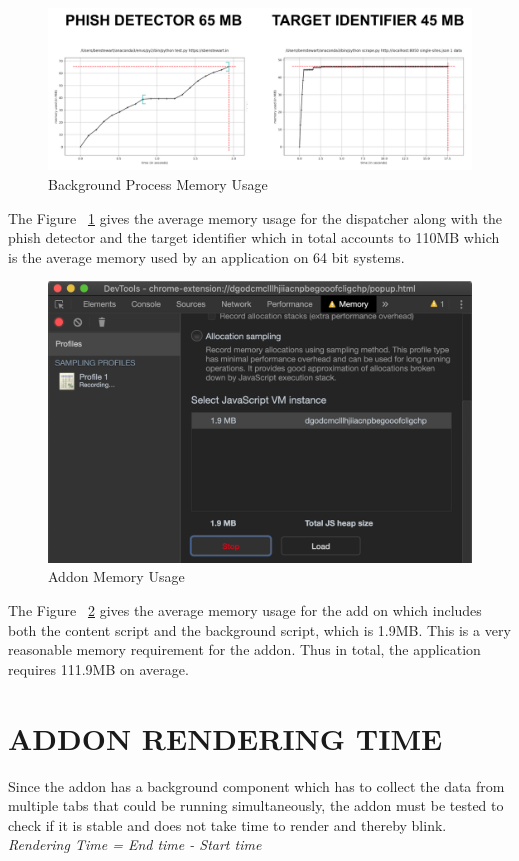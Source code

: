 \begin{figure}[htp]
\centering
\includegraphics[scale=0.5]{Figures/image15.png}
\caption{Background Process Memory Usage}
\label{fig:bpmu}
\end{figure}

The Figure ~\ref{fig:bpmu} gives the average memory usage for the dispatcher along with the phish detector and the target identifier which in total accounts to 110MB which is the average memory used by an application on 64 bit systems.

\begin{figure}[htp]
\centering
\includegraphics[scale=0.5]{Figures/image6.png}
\caption{Addon Memory Usage}
\label{fig:amu}
\end{figure}

The Figure ~\ref{fig:amu} gives the average memory usage for the add on which includes both the content script and the background script, which is 1.9MB. This is a very reasonable memory requirement for the addon. Thus in total, the application requires 111.9MB on average.

\section{ADDON RENDERING TIME}
Since the addon has a background component which has to collect the data from multiple tabs that could be running simultaneously, the addon must be tested to check if it is stable and does not take time to render and thereby blink.\\
\null\quad\textit{Rendering Time = End time - Start time}\\

